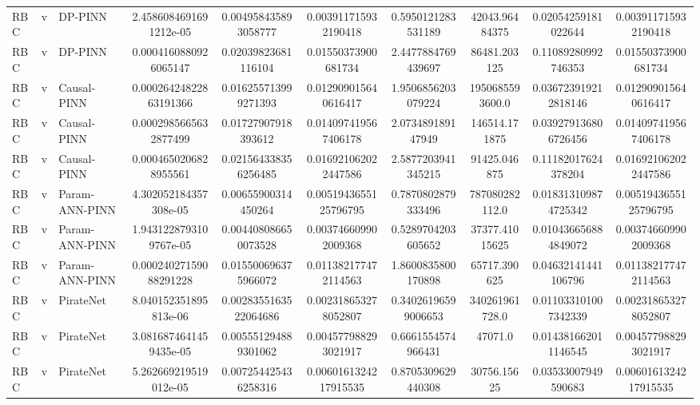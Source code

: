 \begin{landscape}
\begin{longtable}{lllccccccc}
 RBC &     v &        DP-PINN & 2.4586084691691212e-05 &   0.004958435893058777 &   0.003911715932190418 &   0.5950121283531189 &        42043.96484375 &   0.02054259181022644 &   0.003911715932190418 \\
 RBC &     v &        DP-PINN &  0.0004160880926065147 &    0.02039823681116104 &    0.01550373900681734 &   2.4477884769439697 &          86481.203125 &   0.11089280992746353 &    0.01550373900681734 \\
 RBC &     v &    Causal-PINN & 0.00026424822863191366 &   0.016255713999271393 &   0.012909015640616417 &   1.9506856203079224 &       1950685593600.0 &  0.036723919212818146 &   0.012909015640616417 \\
 RBC &     v &    Causal-PINN &  0.0002985665632877499 &    0.01727907918393612 &   0.014097419567406178 &    2.073489189147949 &         146514.171875 &  0.039279136806726456 &   0.014097419567406178 \\
 RBC &     v &    Causal-PINN &  0.0004650206828955561 &   0.021564338356256485 &   0.016921062022447586 &   2.5877203941345215 &          91425.046875 &   0.11182017624378204 &   0.016921062022447586 \\
 RBC &     v & Param-ANN-PINN &  4.302052184357308e-05 &    0.00655900314450264 &  0.0051943655125796795 &   0.7870802879333496 &        787080282112.0 &  0.018313109874725342 &  0.0051943655125796795 \\
 RBC &     v & Param-ANN-PINN & 1.9431228793109767e-05 &   0.004408086650073528 &   0.003746609902009368 &   0.5289704203605652 &        37377.41015625 &  0.010436656884849072 &   0.003746609902009368 \\
 RBC &     v & Param-ANN-PINN & 0.00024027159088291228 &   0.015500696375966072 &   0.011382177472114563 &   1.8600835800170898 &          65717.390625 &   0.04632141441106796 &   0.011382177472114563 \\
 RBC &     v &      PirateNet &  8.040152351895813e-06 &  0.0028355163522064686 &   0.002318653278052807 &  0.34026196599006653 &        340261961728.0 &  0.011033101007342339 &   0.002318653278052807 \\
 RBC &     v &      PirateNet & 3.0816874641459435e-05 &   0.005551294889301062 &   0.004577988293021917 &   0.6661554574966431 &               47071.0 &  0.014381662011146545 &   0.004577988293021917 \\
 RBC &     v &      PirateNet &  5.262669219519012e-05 &   0.007254425436258316 &  0.0060161324217915535 &   0.8705309629440308 &           30756.15625 &   0.03533007949590683 &  0.0060161324217915535 \\

\end{longtable}
\end{landscape}
